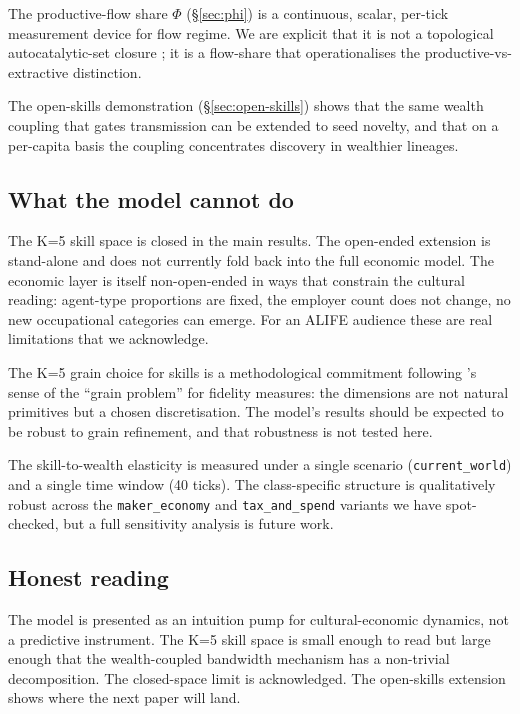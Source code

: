 \documentclass[11pt]{article}
\begin{document}
The productive-flow share $\Phi$ (\S\ref{sec:phi}) is a continuous,
scalar, per-tick measurement device for flow regime. We are explicit
that it is not a topological autocatalytic-set closure
\citep{kauffman1988evolution, hordijk2004detecting}; it is a
flow-share that operationalises the productive-vs-extractive
distinction.

The open-skills demonstration (\S\ref{sec:open-skills}) shows that
the same wealth coupling that gates transmission can be extended to
seed novelty, and that on a per-capita basis the coupling
concentrates discovery in wealthier lineages.

\subsection{What the model cannot do}

The K=5 skill space is closed in the main results. The open-ended
extension is stand-alone and does not currently fold back into the
full economic model. The economic layer is itself non-open-ended in
ways that constrain the cultural reading: agent-type proportions are
fixed, the employer count does not change, no new occupational
categories can emerge. For an ALIFE audience these are real
limitations that we acknowledge.

The K=5 grain choice for skills is a methodological commitment
following \citet{charbonneau2021fidelity}'s sense of the
``grain problem'' for fidelity measures: the dimensions are not
natural primitives but a chosen discretisation. The model's results
should be expected to be robust to grain refinement, and that
robustness is not tested here.

The skill-to-wealth elasticity is measured under a single scenario
(\texttt{current\_world}) and a single time window (40 ticks). The
class-specific structure is qualitatively robust across the
\texttt{maker\_economy} and \texttt{tax\_and\_spend} variants we
have spot-checked, but a full sensitivity analysis is future work.

\subsection{Honest reading}

The model is presented as an intuition pump for cultural-economic
dynamics, not a predictive instrument. The K=5 skill space is small
enough to read but large enough that the wealth-coupled bandwidth
mechanism has a non-trivial decomposition. The closed-space limit is
acknowledged. The open-skills extension shows where the next paper
will land.
\end{document}
